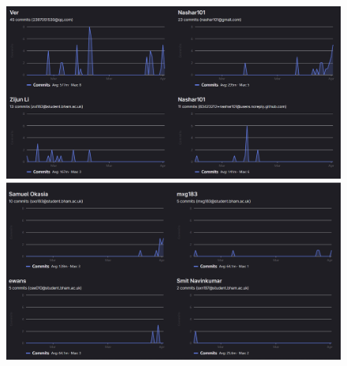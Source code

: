 \documentclass[a4paper]{article}
\begin{document}
\begin{figure}[H]
    \centering
    \begin{minipage}{0.49\textwidth}
      \centering
      \includegraphics[width=\linewidth]{./image/Contributor_1.png}
    \end{minipage}\hfill
    \begin{minipage}{0.49\textwidth}
      \centering
      \includegraphics[width=\linewidth]{./image/Contributor_2.png}
    \end{minipage}
\end{figure}
\end{document}
